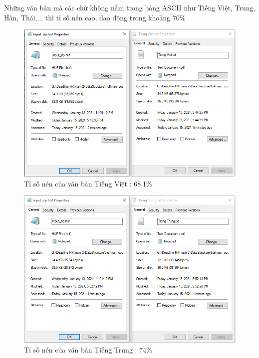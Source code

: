 \documentclass[14pt]{extreport}
\begin{document}
Những văn bản mà các chứ không nằm trong bảng ASCII như Tiếng Việt, Trung, Hàn, Thái,... thì tỉ số nén cao, dao động trong khoảng 70\%
\begin{center}
    \begin{figure}[H]
    \begin{center}
     \includegraphics[scale=1]{tisonen_TiengViet.PNG}
    \end{center}
    \caption{Tỉ số nén của văn bản Tiếng Việt : 68.1\%}
    \label{refhinh1}
    \end{figure}
\end{center}

\begin{center}
    \begin{figure}[H]
    \begin{center}
     \includegraphics[scale=1]{tisonen_TiengTrung.PNG}
    \end{center}
    \caption{Tỉ số nén của văn bản Tiếng Trung : 74\%}
    \label{refhinh1}
    \end{figure}
\end{center}
\end{document}
